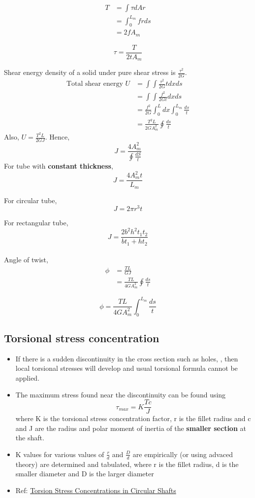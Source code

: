\documentclass{article}
\begin{document}
	\begin{align*}
		T &= \int \tau dA r\\
		  &= \int_0^{L_m} frds\\
		  &= 2 f A_m 
	\end{align*}

	\[\boxed{\tau= \frac{T}{2tA_m}}\]

	Shear energy density of a solid under pure shear stress is $\frac{\tau^2}{2G}$. 
	\begin{align*}
		\text{Total shear energy }U &= \int\int \frac{\tau^2}{2G} t dx ds\\
								   &= \int \int \frac{f^2}{2Gt} dx ds\\
								   &= \frac{f^2}{2G} \int_0^L dx \int_0^{L_m} \frac{ds}{t}\\
								   &= \frac{T^2 L}{2G A_m^2} \oint \frac{ds}{t}
	\end{align*}
	Also, $U = \frac{T^2 L}{2G J}$.
	Hence, 
		\[\boxed{J = \frac{4A_m^2}{\oint\frac{dS}{t}}}\]
	For tube with \textbf{constant thickness},
		\[\boxed{J = \frac{4A_m^2t}{L_m}}\]

	For circular tube,
		\[J= 2\pi r^3 t\]

	For rectangular tube, 
		\[J = \frac{2b^2 h^2 t_1 t_2}{bt_1 + ht_2}\]\\

	Angle of twist,
	\begin{align*}
		\phi &= \frac{TL}{GJ}\\
			 &= \frac{TL}{4GA_m^2}\oint \frac{ds}{t}
	\end{align*}

	\[\boxed{\phi = \frac{TL}{4GA_m^2}\int_0^{L_m} \frac{ds}{t}}\]


	\subsection{Torsional stress concentration}
	\begin{itemize}
		\item If there is a sudden discontinuity in the cross section such as holes, , then local torsional stresses will develop and usual torsional formula cannot be applied.
		\item The maximum stress found near the discontinuity can be found using
		\[\tau_{max} = K \frac{Tc}{J}\]
		where K is the torsional stress concentration factor, r is the fillet radius and c and J are the radius and polar moment of inertia of the \textbf{smaller section} at the shaft.
		\item K values for various values of $\frac{r}{d}$ and $\frac{D}{d}$ are empirically (or using advaced theory) are determined and tabulated, where r is the fillet radius, d is the smaller diameter and D is the larger diameter
		\item Ref: \href{https://classes.mst.edu/civeng110/concepts/06/concentration/index.html#:~:text=The%20ratio%20of%20the%20true,of%20stress%20raiser%20in%20question.}{Torsion Stress Concentrations in Circular Shafts}
	\end{itemize}
\end{document}
